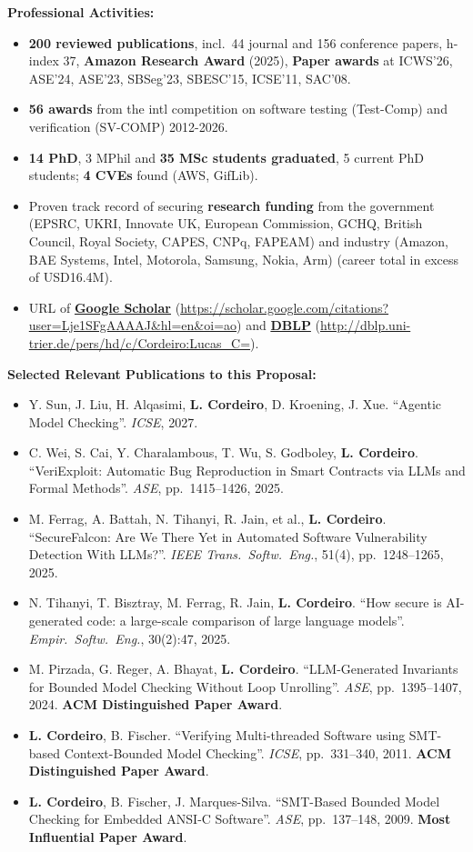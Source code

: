 \documentclass[11pt,letterpaper]{article}
\newenvironment{cvlist}%
  {\begin{itemize}[label={},leftmargin=27.2pt,itemindent=-21.8pt,
                   labelsep=0pt,labelwidth=0pt,itemsep=2pt,parsep=0pt,
                   topsep=4pt,partopsep=0pt]}%
  {\end{itemize}}
\newcommand{\cvsection}[1]{\vspace{7pt}\par\textbf{#1}}
\begin{document}
\cvsection{Professional Activities:}
\begin{cvlist}
\item \textbf{200 reviewed publications}, incl.\ 44 journal and 156 conference papers, h-index 37,
  \textbf{Amazon Research Award} (2025), \textbf{Paper awards} at ICWS'26, ASE'24, ASE'23, SBSeg'23,
  SBESC'15, ICSE'11, SAC'08.
\item \textbf{56 awards} from the intl competition on software testing (Test-Comp) and verification (SV-COMP) 2012-2026.
\item \textbf{14 PhD}, 3 MPhil and \textbf{35 MSc students graduated}, 5 current PhD students; \textbf{4 CVEs} found (AWS, GifLib).
\item Proven track record of securing \textbf{research funding} from the government (EPSRC, UKRI, Innovate UK,
  European Commission, GCHQ, British Council, Royal Society, CAPES, CNPq, FAPEAM) and industry (Amazon,
  BAE Systems, Intel, Motorola, Samsung, Nokia, Arm) (career total in excess of USD16.4M).
\item URL of \href{https://scholar.google.com/citations?user=Lje1SFgAAAAJ&hl=en&oi=ao}{\textbf{Google Scholar}}
  (\url{https://scholar.google.com/citations?user=Lje1SFgAAAAJ&hl=en&oi=ao}) and
  \href{http://dblp.uni-trier.de/pers/hd/c/Cordeiro:Lucas_C=}{\textbf{DBLP}}
  (\url{http://dblp.uni-trier.de/pers/hd/c/Cordeiro:Lucas_C=}).
\end{cvlist}

\cvsection{Selected Relevant Publications to this Proposal:}
\begin{cvlist}
\item Y. Sun, J. Liu, H. Alqasimi, \textbf{L. Cordeiro}, D. Kroening, J. Xue. ``Agentic Model Checking''.
  \emph{ICSE}, 2027.
\item C. Wei, S. Cai, Y. Charalambous, T. Wu, S. Godboley, \textbf{L. Cordeiro}. ``VeriExploit: Automatic Bug
  Reproduction in Smart Contracts via LLMs and Formal Methods''. \emph{ASE}, pp.~1415--1426, 2025.
\item M. Ferrag, A. Battah, N. Tihanyi, R. Jain, et al., \textbf{L. Cordeiro}. ``SecureFalcon: Are We There Yet in Automated Software Vulnerability Detection
  With LLMs?''. \emph{IEEE Trans.\ Softw.\ Eng.}, 51(4), pp.~1248--1265, 2025.
\item N. Tihanyi, T. Bisztray, M. Ferrag, R. Jain, \textbf{L. Cordeiro}. ``How secure is AI-generated code: a large-scale
  comparison of large language models''. \emph{Empir.\ Softw.\ Eng.}, 30(2):47, 2025.
\item M. Pirzada, G. Reger, A. Bhayat, \textbf{L. Cordeiro}. ``LLM-Generated Invariants for Bounded Model Checking
  Without Loop Unrolling''. \emph{ASE}, pp.~1395--1407, 2024. \textbf{ACM Distinguished Paper Award}.
\item \textbf{L. Cordeiro}, B. Fischer. ``Verifying Multi-threaded Software using SMT-based Context-Bounded Model Checking''.
  \emph{ICSE}, pp.~331--340, 2011. \textbf{ACM Distinguished Paper Award}.
\item \textbf{L. Cordeiro}, B. Fischer, J. Marques-Silva. ``SMT-Based Bounded Model Checking for Embedded ANSI-C
  Software''. \emph{ASE}, pp.~137--148, 2009. \textbf{Most Influential Paper Award}.
\end{cvlist}
\end{document}
